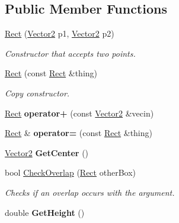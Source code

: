 \subsection*{Public Member Functions}
\begin{DoxyCompactItemize}
\item 
\hyperlink{class_rect_ad24b6cae9dd49da138e054b7b7b5ac3f}{Rect} (\hyperlink{class_vector2}{Vector2} p1, \hyperlink{class_vector2}{Vector2} p2)
\begin{DoxyCompactList}\small\item\em Constructor that accepts two points. \end{DoxyCompactList}\item 
\hypertarget{class_rect_a3f92c92e465b3a789f4da3e0d295c53a}{}\label{class_rect_a3f92c92e465b3a789f4da3e0d295c53a} 
\hyperlink{class_rect_a3f92c92e465b3a789f4da3e0d295c53a}{Rect} (const \hyperlink{class_rect}{Rect} \&thing)
\begin{DoxyCompactList}\small\item\em Copy constructor. \end{DoxyCompactList}\item 
\hypertarget{class_rect_a176d3cbbec5903c85063cac2fb380afc}{}\label{class_rect_a176d3cbbec5903c85063cac2fb380afc} 
\hyperlink{class_rect}{Rect} {\bfseries operator+} (const \hyperlink{class_vector2}{Vector2} \&vecin)
\item 
\hypertarget{class_rect_a9aeefc780b44fc2cf9c151e4c24cba9d}{}\label{class_rect_a9aeefc780b44fc2cf9c151e4c24cba9d} 
\hyperlink{class_rect}{Rect} \& {\bfseries operator=} (const \hyperlink{class_rect}{Rect} \&thing)
\item 
\hypertarget{class_rect_abe5622a1eb8736a2022e3e01ea983c73}{}\label{class_rect_abe5622a1eb8736a2022e3e01ea983c73} 
\hyperlink{class_vector2}{Vector2} {\bfseries Get\+Center} ()
\item 
\hypertarget{class_rect_a5744f2db0f140913670eeda0649ab201}{}\label{class_rect_a5744f2db0f140913670eeda0649ab201} 
bool \hyperlink{class_rect_a5744f2db0f140913670eeda0649ab201}{Check\+Overlap} (\hyperlink{class_rect}{Rect} other\+Box)
\begin{DoxyCompactList}\small\item\em Checks if an overlap occurs with the argument. \end{DoxyCompactList}\item 
\hypertarget{class_rect_ae4e3467a3e1f5c23686326a8c6bbafcf}{}\label{class_rect_ae4e3467a3e1f5c23686326a8c6bbafcf} 
double {\bfseries Get\+Height} ()
\item 

\end{DoxyCompactItemize}

